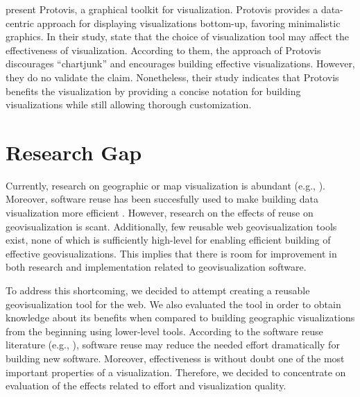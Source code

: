 \citet{bostock_protovis:_2009} present Protovis, a graphical toolkit for visualization. Protovis provides a data-centric approach for displaying visualizations bottom-up, favoring minimalistic graphics. In their study, \citeauthor{bostock_protovis:_2009} state that the choice of visualization tool may affect the effectiveness of visualization. According to them, the approach of Protovis discourages ``chartjunk'' and encourages building effective visualizations. However, they do no validate the claim. Nonetheless, their study indicates that Protovis benefits the visualization by providing a concise notation for building visualizations while still allowing thorough customization.

\section{Research Gap}

Currently, research on geographic or map visualization is abundant (e.g., \citealt{kraak_cartographic_1998,kraak_cartography_2011,slocum_thematic_2014,schlichtmann_visualization_2002}). Moreover, software reuse has been succesfully used to make building data visualization more efficient \citep{heer_prefuse:_2005,bostock_protovis:_2009}. However, research on the effects of reuse on geovisualization is scant. Additionally, few reusable web geovisualization tools exist, none of which is sufficiently high-level for enabling efficient building of effective geovisualizations. This implies that there is room for improvement in both research and implementation related to geovisualization software.

To address this shortcoming, we decided to attempt creating a reusable geovisualization tool for the web. We also evaluated the tool in order to obtain knowledge about its benefits when compared to building geographic visualizations from the beginning using lower-level tools. According to the software reuse literature (e.g., \citealt{mohagheghi_empirical_2008,boehm_managing_1999}), software reuse may reduce the needed effort dramatically for building new software. Moreover, effectiveness is without doubt one of the most important properties of a visualization. Therefore, we decided to concentrate on evaluation of the effects related to effort and visualization quality.
